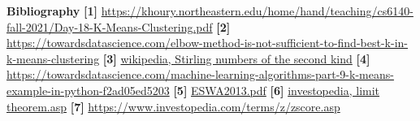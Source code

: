 \documentclass[12pt]{article}
\begin{document}
\newpage
\textbf{Bibliography} \newline
\textbf{[1]} \href{https://khoury.northeastern.edu/home/hand/teaching/cs6140-fall-2021/Day-18-K-Means-Clustering.pdf}{https://khoury.northeastern.edu/home/hand/teaching/cs6140-fall-2021/Day-18-K-Means-Clustering.pdf} \newline
\textbf{[2]} \href{https://towardsdatascience.com/elbow-method-is-not-sufficient-to-find-best-k-in-k-means-clustering-fc820da0631d#:~:text=The%20elbow%20method%20is%20a,cluster%20and%20the%20cluster%20centroid.}{https://towardsdatascience.com/elbow-method-is-not-sufficient-to-find-best-k-in-k-means-clustering} \newline
\textbf{[3]} \href{https://en.wikipedia.org/wiki/Stirling_numbers_of_the_second_kind}{wikipedia, Stirling numbers of the second kind} \newline
\textbf{[4]} \href{https://towardsdatascience.com/machine-learning-algorithms-part-9-k-means-example-in-python-f2ad05ed5203}{https://towardsdatascience.com/machine-learning-algorithms-part-9-k-means-example-in-python-f2ad05ed5203} \newline
\textbf{[5]} \href{https://faculty.uca.edu/ecelebi/documents/ESWA_2013.pdf}{ESWA2013.pdf} \newline
\textbf{[6]} \href{https://www.investopedia.com/terms/c/central_limit_theorem.asp#:~:text=Key%20Takeaways-,The%20central%20limit%20theorem%20(CLT)%20states%20that%20the%20distribution%20of,for%20the%20CLT%20to%20hold.}{investopedia, limit theorem.asp} \newline
\textbf{[7]} \href{https://www.investopedia.com/terms/z/zscore.asp#:~:text=Investopedia%20%2F%20Tara%20Anand-,What%20Is%20Z%2DScore%3F,identical%20to%20the%20mean%20score.}{https://www.investopedia.com/terms/z/zscore.asp}
\end{document}
